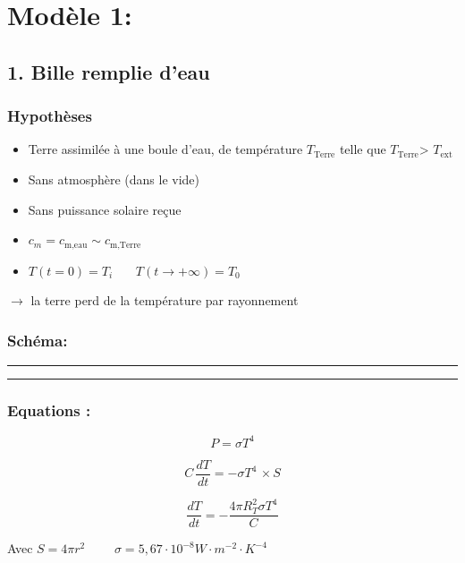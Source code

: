 \documentclass[a4paper,12pt]{article}
\begin{document}
\section*{Modèle 1:}
\subsection*{1. Bille remplie d'eau}
\subsubsection*{Hypothèses}
\begin{itemize}
    \item Terre assimilée à une boule d'eau, de température \(T_{\text{Terre}}\) telle que \(T_{\text{Terre}}\)> \(T_{\text{ext}}\)
    \item  Sans atmosphère (dans le vide)
    \item  Sans puissance solaire reçue  
    \item \(c_{m}= c_{\text{m,eau}} \sim c_{\text{m,Terre}}\) 
    \item $T(t=0) = T_i$ \ \ \
$T(t \to +\infty) = T_0$
   
\end{itemize}
$\rightarrow$ la terre perd de la température par rayonnement
\\ 

\subsubsection*{Schéma:} 
\noindent\textcolor{gray}{\rule{\linewidth}{0.4pt}}

    
\begin{center}
  
\end{center}



\noindent\textcolor{gray}{\rule{\linewidth}{0.4pt}} 

\vspace{1em}

\subsubsection*{Equations :} 
\[   P= \sigma T^4 
\]

\[    C \, \frac{dT}{dt} = - \sigma T^4 \,  \times S
\]

\[\frac{dT}{dt} = - \frac{4 \pi R_T^2 \sigma T^4}{C}\]  

Avec 
\(S= 4\pi r^2\)
\ \ \ \
\(\sigma=5,67 \cdot 10^{-8} W\cdot m^{-2} \cdot K^{-4}\)
\end{document}
